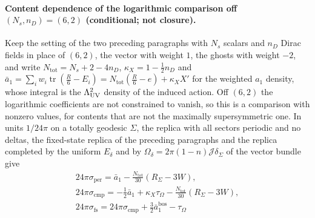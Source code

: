 \paragraph{Content dependence of the logarithmic comparison off \((N_s,n_D)=(6,2)\) (conditional; not closure).}
Keep the setting of the two preceding paragraphs with \(N_s\) scalars and \(n_D\) Dirac fields in place of \((6,2)\), the vector with weight \(1\), the ghosts with weight \(-2\), and write \(N_{\mathrm{tot}}=N_s+2-4n_D\), \(\kappa_X=1-\tfrac12n_D\) and \(\bar a_1=\sum_iw_i\operatorname{tr}(\tfrac R6-E_i)=N_{\mathrm{tot}}(\tfrac R6-e)+\kappa_XX'\) for the weighted \(a_1\) density, whose integral is the \(\Lambda_{\mathrm{UV}}^2\) density of the induced action. Off \((6,2)\) the logarithmic coefficients are not constrained to vanish, so this is a comparison with nonzero values, for contents that are not the maximally supersymmetric one. In units \(1/24\pi\) on a totally geodesic \(\Sigma\), the replica with all sectors periodic and no deltas, the fixed-state replica of the preceding paragraphs and the replica completed by the uniform \(E_\delta\) and by \(\Omega_\delta=2\pi(1-n)\mathcal J\delta_\Sigma\) of the vector bundle give
\begin{multline*}
  24\pi\sigma_{\mathrm{per}}=\bar a_1-\tfrac{N_{\mathrm{tot}}}{30}(R_\Sigma-3W), \\
  24\pi\sigma_{\mathrm{cmp}}=-\tfrac12\bar a_1+\kappa_X\tau_\Omega-\tfrac{N_{\mathrm{tot}}}{30}(R_\Sigma-3W), \\
  24\pi\sigma_{\mathrm{fs}}=24\pi\sigma_{\mathrm{cmp}}+\tfrac32\bar a_1^{\mathrm{bos}}-\tau_\Omega
\end{multline*}
